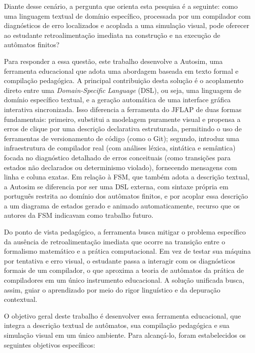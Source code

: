 \documentclass[
    12pt
    ,oneside
    ,a4paper
    ,chapter=TITLE
    ,section=TITLE
    ,sumario=abnt-6027-2012]{abntex2}
\begin{document}
Diante desse cenário, a pergunta que orienta esta pesquisa é a seguinte: como uma
linguagem textual de domínio específico, processada por um compilador com diagnósticos
de erro localizados e acoplada a uma simulação visual, pode oferecer ao estudante
retroalimentação imediata na construção e na execução de autômatos finitos?

Para responder a essa questão, este trabalho desenvolve a Autosim, uma ferramenta
educacional que adota uma abordagem baseada em texto formal e compilação
pedagógica. A principal contribuição desta solução é o acoplamento direto entre
uma \textit{Domain-Specific Language} (DSL), ou seja, uma linguagem de domínio específico
textual, e a geração automática de uma interface gráfica interativa sincronizada. Isso diferencia a ferramenta do JFLAP de duas
formas fundamentais: primeiro, substitui a modelagem puramente visual e propensa a
erros de clique por uma descrição declarativa estruturada, permitindo o uso de ferramentas
de versionamento de código (como o Git); segundo, introduz uma infraestrutura
de compilador real (com análises léxica, sintática e semântica) focada no diagnóstico
detalhado de erros conceituais (como transições para estados não declarados ou
determinismo violado), fornecendo mensagens com linha e coluna exatas. Em relação à FSM,
que também adota a descrição textual, a Autosim se diferencia por ser uma DSL externa, com
sintaxe própria em português restrita ao domínio dos autômatos finitos, e por acoplar essa
descrição a um diagrama de estados gerado e animado automaticamente, recurso que os autores
da FSM indicavam como trabalho futuro.

Do ponto de vista pedagógico, a ferramenta busca mitigar o problema específico da
ausência de retroalimentação imediata que ocorre na transição entre o formalismo matemático
e a prática computacional. Em vez de testar sua máquina por tentativa e erro visual, o
estudante passa a interagir com os diagnósticos formais de um compilador, o que aproxima a
teoria de autômatos da prática de compiladores em um único instrumento educacional. A
solução unificada busca, assim, guiar o aprendizado por meio do rigor linguístico e da
depuração contextual.

O objetivo geral deste trabalho é desenvolver essa ferramenta educacional, que integra
a descrição textual de autômatos, sua compilação pedagógica e sua simulação visual em
um único ambiente. Para alcançá-lo, foram estabelecidos os seguintes objetivos
específicos:
\end{document}
